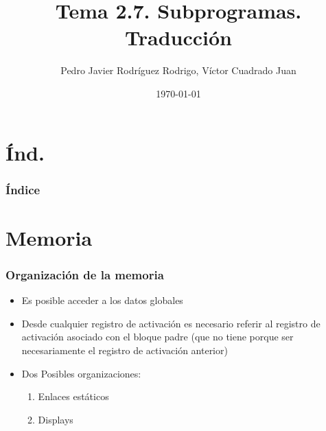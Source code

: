 \documentclass[hyperref={pdfpagelabels=false},tree-dvips,compress]{beamer}
\title{Tema 2.7. Subprogramas. Traducción}
\author{Pedro Javier Rodríguez Rodrigo, Víctor Cuadrado Juan}
\date{\today}
\begin{document}
\begin{frame}
\titlepage
\end{frame}
\section{Índ.}
\begin{frame}[fragile]
\frametitle{Índice}
	\tiny\tableofcontents
\end{frame}
\section{Memoria}
\begin{frame}[fragile]
\frametitle{Organización de la memoria}

\begin{itemize}[<+->]%
	\item Es posible acceder a los datos globales
	\item Desde cualquier registro de activación es necesario referir al registro de activación asociado con el bloque padre (que no tiene porque ser necesariamente el registro de activación anterior)
	\item Dos Posibles organizaciones:
		\begin{enumerate}[<+->]
			\item Enlaces estáticos
			\item Displays
		\end{enumerate}
\end{itemize}

\end{frame}
\end{document}
